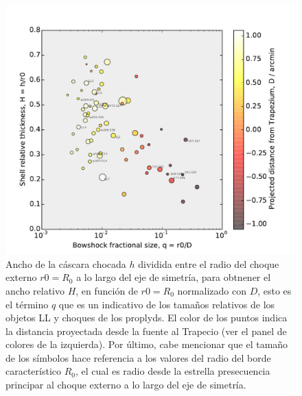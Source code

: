 \begin{figure}
  \centering
  \includegraphics[width=\linewidth]{luis-programas/will-H-vs-q}
  \caption{Ancho de la cáscara chocada \(h\) dividida entre el radio del choque externo \(r0 = R_{0}\) a lo largo del eje de simetría, para obtnener el ancho relativo \(H\), en función de  \(r0 = R_{0}\) normalizado con \(D\), esto es el término \(q\) que es un indicativo de los tamaños relativos de los objetos LL y choques de los proplyds. El color de los puntos indica la distancia proyectada desde la fuente al Trapecio (ver el panel de colores de la izquierda). Por último, cabe mencionar que el tamaño de los símbolos hace referencia a los valores del radio del borde característico  \(R_{0}\), el cual es radio desde la estrella presecuencia principar al choque externo a lo largo del eje de simetría.}
  \label{fig:thikness}
\end{figure} 

